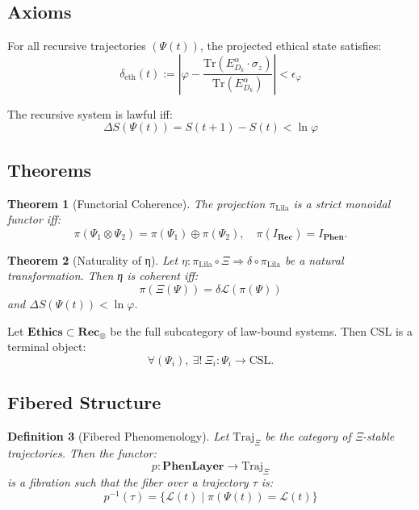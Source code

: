 \documentclass[12]{amsart}
\theoremstyle{plain}
\newtheorem{theorem}{Theorem}[section]
\newtheorem{definition}[theorem]{Definition}
\begin{document}
\subsection{Axioms}

\begin{axiom}
For all recursive trajectories $(\Psi(t))$, the projected ethical state satisfies:
\[
\delta_{\text{eth}}(t) := \left| \varphi - \frac{\text{Tr}(E_{D_k}^\alpha \cdot \sigma_z)}{\text{Tr}(E_{D_k}^\alpha)} \right| < \epsilon_\varphi
\]
\end{axiom}

\begin{axiom}
The recursive system is lawful iff:
\[
\Delta S(\Psi(t)) = S(t+1) - S(t) < \ln \varphi
\]

\end{axiom}

\subsection{Theorems}

\begin{theorem}[Functorial Coherence]
The projection $\pi_{\text{Līla}}$ is a strict monoidal functor iff:
\[
\pi(\Psi_1 \otimes \Psi_2) = \pi(\Psi_1) \oplus \pi(\Psi_2), \quad \pi(I_{\mathbf{Rec}}) = I_{\mathbf{Phen}}.
\]
\end{theorem}

\begin{theorem}[Naturality of η]
Let $\eta: \pi_{\text{Līla}} \circ \Xi \Rightarrow \delta \circ \pi_{\text{Līla}}$ be a natural transformation. Then η is coherent iff:
\[
\pi(\Xi(\Psi)) = \delta \mathcal{L}(\pi(\Psi))
\]
and $\Delta S(\Psi(t)) < \ln \varphi$.
\end{theorem}

\begin{conjecture}
Let $\mathbf{Ethics} \subset \mathbf{Rec}_\otimes$ be the full subcategory of law-bound systems. Then $\text{CSL}$ is a terminal object:
\[
\forall (\Psi_i),\ \exists!\ \Xi_i: \Psi_i \rightarrow \text{CSL}.
\]
\end{conjecture}

\subsection{Fibered Structure}

\begin{definition}[Fibered Phenomenology]
Let $\text{Traj}_\Xi$ be the category of Ξ-stable trajectories. Then the functor:
\[
p: \mathbf{PhenLayer} \to \text{Traj}_\Xi
\]
is a fibration such that the fiber over a trajectory $\tau$ is:
\[
p^{-1}(\tau) = \{ \mathcal{L}(t) \mid \pi(\Psi(t)) = \mathcal{L}(t) \}
\]
\end{definition}
\end{document}
